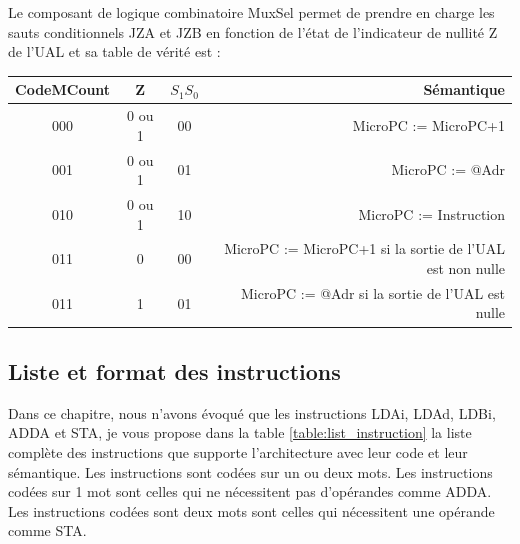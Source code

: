 Le composant de logique combinatoire MuxSel permet de prendre en charge les sauts conditionnels JZA et JZB en fonction de l'état de l'indicateur de nullité Z de l'UAL et sa table de vérité est :

\begin{tabular}{cc|cr}
CodeMCount & Z & $S_1S_0$ & Sémantique\\
\hline
000 &  0 ou 1 & 00 & MicroPC := MicroPC+1\\
001 &  0 ou 1 & 01 & MicroPC := @Adr\\
010 &  0 ou 1 & 10 & MicroPC := Instruction\\
011 &  0 & 00 & MicroPC := MicroPC+1  si la sortie de l'UAL est non nulle\\
011 &  1 & 01 & MicroPC := @Adr si la sortie de l'UAL est nulle
\end{tabular}


\subsection{Liste et format des instructions}

Dans ce chapitre, nous n'avons évoqué que les instructions LDAi, LDAd, LDBi, ADDA et STA, je vous propose dans la table \ref{table:list_instruction} la liste complète des instructions que supporte l'architecture avec leur code et leur sémantique. Les instructions sont codées sur un ou deux mots. Les instructions codées sur 1 mot sont celles qui ne nécessitent pas d'opérandes comme ADDA. Les instructions codées sont deux mots sont celles qui nécessitent une opérande comme STA.

